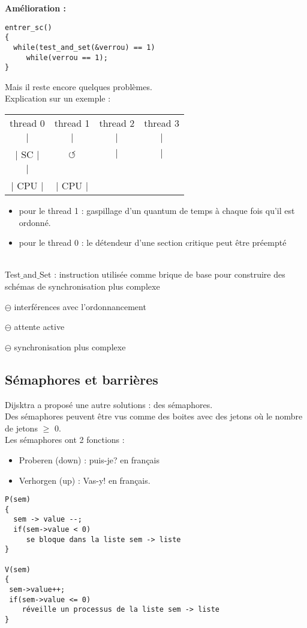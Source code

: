 \documentclass[12pt,a4paper]{report}
\begin{document}
\textbf{Amélioration :}
\smallskip
\begin{verbatim}
entrer_sc()
{
  while(test_and_set(&verrou) == 1)
     while(verrou == 1);
}
\end{verbatim}
\bigskip

Mais il reste encore quelques problèmes.\\
Explication sur un exemple :
\begin{center}
\begin{tabular}{c c c c}
thread 0 & thread 1 & thread 2 & thread 3 \\
$\mid$ & $\mid$ & $\mid$ & $\mid$ \\
$\mid$ SC $\mid$ & $\circlearrowleft$ & $\mid$ & $\mid$\\
$\mid$ & & & \\
$\mid$ CPU $\mid$ & $\mid$ CPU $\mid$ & & \\
\end{tabular}
\end{center}

\begin{itemize}
\item pour le thread 1 : gaspillage d'un quantum de temps à chaque fois qu'il est ordonné.
\item pour le thread 0 : le détendeur d'une section critique peut être préempté \\
\\
\end{itemize}

Test$\_$and$\_$Set : instruction utilisée comme brique de base pour construire des schémas de synchronisation plus complexe
\begin{description}
\item$\ominus$ interférences avec l'ordonnancement
\item$\ominus$ attente active
\item$\ominus$ synchronisation plus complexe\\
\end{description}

\subsection{Sémaphores et barrières}
Dijsktra a proposé une autre solutions : des sémaphores.\\
Des sémaphores peuvent être vus comme des boites avec des jetons où le nombre de jetons $\geq$ 0.\\

Les sémaphores ont 2 fonctions : 
\begin{itemize}
\item Proberen (down) : puis-je? en français
\item Verhorgen (up) : Vas-y! en français.
\end{itemize}
\medskip
\begin{verbatim}
P(sem)
{
  sem -> value --;
  if(sem->value < 0)
     se bloque dans la liste sem -> liste
}

V(sem)
{
 sem->value++;
 if(sem->value <= 0)
    réveille un processus de la liste sem -> liste
}
\end{verbatim}
\end{document}
